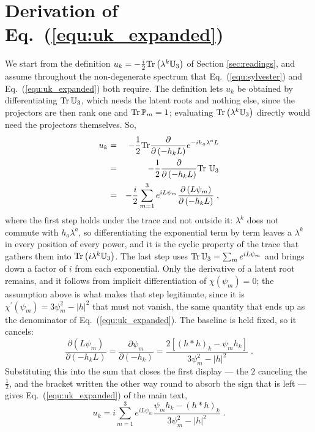 \documentclass[final,5p,times,twocolumn,sort,compress]{elsarticle}
\newcommand{\eq}{Eq.}
\newcommand{\equ}[1]{\eq~(\ref{equ:#1})}
\begin{document}

\section{Derivation of \equ{uk_expanded}}
\label{app:derivation_uk_expanded}
\appresetfloats

We start from the definition $u_k = -\frac{i}{2}{\rm Tr}\left(\lambda^k \mathbb{U}_3\right)$ of Section \ref{sec:readings}, and assume throughout the non-degenerate spectrum that \equ{sylvester} and \equ{uk_expanded} both require.  The definition lets $u_k$ be obtained by differentiating ${\rm Tr}\,\mathbb{U}_3$, which needs the latent roots and nothing else, since the projectors are then rank one and ${\rm Tr}\,\mathbb{P}_m = 1$; evaluating ${\rm Tr}\left(\lambda^k \mathbb{U}_3\right)$ directly would need the projectors themselves.  So,
\begin{eqnarray}
 u_k 
 &=& -\frac{1}{2}{\rm Tr}\frac{\partial}{\partial\left(-h_kL\right)}e^{-ih_a\lambda^aL} \nonumber \\
 &=& -\frac{1}{2}\frac{\partial}{\partial\left(-h_kL\right)}{\rm Tr}~\mathbb{U}_3 \nonumber \\
 &=& -\frac{i}{2}\sum_{m=1}^3 e^{iL\psi_m} \frac{\partial\left(L\psi_m\right)}{\partial\left(-h_kL\right)} \;,
\end{eqnarray}
where the first step holds under the trace and not outside it: $\lambda^k$ does not commute with $h_a \lambda^a$, so differentiating the exponential term by term leaves a $\lambda^k$ in every position of every power, and it is the cyclic property of the trace that gathers them into ${\rm Tr}\left(i \lambda^k \mathbb{U}_3\right)$.  The last step uses ${\rm Tr}\,\mathbb{U}_3 = \sum_m e^{iL\psi_m}$ and brings down a factor of $i$ from each exponential.  Only the derivative of a latent root remains, and it follows from implicit differentiation of $\chi\left(\psi_m\right) = 0$; the assumption above is what makes that step legitimate, since it is $\chi^\prime\left(\psi_m\right) = 3\psi_m^2 - \lvert h \rvert^2$ that must not vanish, the same quantity that ends up as the denominator of \equ{uk_expanded}.  The baseline is held fixed, so it cancels:
\begin{equation}
 \frac{\partial\left(L\psi_m\right)}{\partial\left(-h_kL\right)}
 =
 \frac{\partial\psi_m}{\partial\left(-h_k\right)}
 =
 \frac{2\left[\left(h \ast h\right)_k - \psi_m h_k\right]}{3\psi_m^2-\lvert h \rvert^2} \;.
\end{equation}
Substituting this into the sum that closes the first display --- the $2$ canceling the $\tfrac{1}{2}$, and the bracket written the other way round to absorb the sign that is left --- gives \equ{uk_expanded} of the main text,
\begin{equation}
 u_k
 =
 i\sum_{m=1}^3
 e^{i L \psi_m} \frac{\psi_m h_k - \left(h \ast h\right)_k}{3\psi_m^2 - \left\vert h \right\vert^2} \;.
\end{equation}
\end{document}
